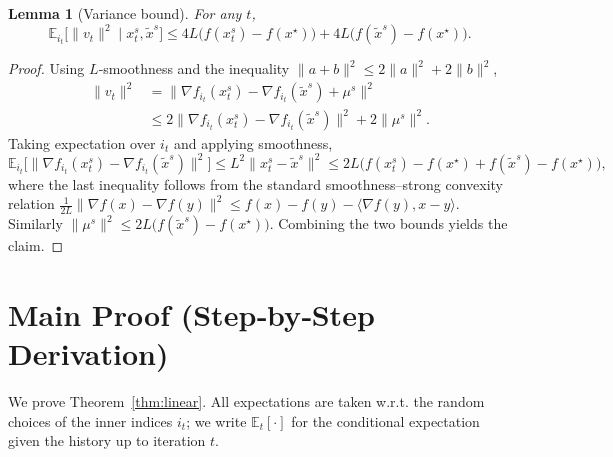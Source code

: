 \documentclass{article}
\newtheorem{lemma}{Lemma}
\begin{document}
\begin{lemma}[Variance bound]
\label{lem:variance}
For any $t$,
\[
\mathbb{E}_{i_t}\!\bigl[\|v_t\|^{2}\mid x^{s}_t,\tilde{x}^{s}\bigr]
\le 4L\bigl(f(x^{s}_t)-f(x^{\star})\bigr)
   +4L\bigl(f(\tilde{x}^{s})-f(x^{\star})\bigr).
\]
\end{lemma}
\begin{proof}
Using $L$‑smoothness and the inequality $\|a+b\|^{2}\le 2\|a\|^{2}+2\|b\|^{2}$,
\[
\begin{aligned}
\|v_t\|^{2}
&=\bigl\|\nabla f_{i_t}(x^{s}_t)-\nabla f_{i_t}(\tilde{x}^{s})
          +\mu^{s}\bigr\|^{2}\\
&\le 2\bigl\|\nabla f_{i_t}(x^{s}_t)-\nabla f_{i_t}(\tilde{x}^{s})\bigr\|^{2}
   +2\|\mu^{s}\|^{2}.
\end{aligned}
\]
Taking expectation over $i_t$ and applying smoothness,
\[
\mathbb{E}_{i_t}\!\bigl[\|\nabla f_{i_t}(x^{s}_t)-\nabla f_{i_t}(\tilde{x}^{s})\|^{2}\bigr]
\le L^{2}\|x^{s}_t-\tilde{x}^{s}\|^{2}
\le 2L\bigl(f(x^{s}_t)-f(x^{\star})+f(\tilde{x}^{s})-f(x^{\star})\bigr),
\]
where the last inequality follows from the standard smoothness–strong convexity relation
$\frac{1}{2L}\|\nabla f(x)-\nabla f(y)\|^{2}\le f(x)-f(y)-\langle\nabla f(y),x-y\rangle$.
Similarly $\|\mu^{s}\|^{2}\le 2L\bigl(f(\tilde{x}^{s})-f(x^{\star})\bigr)$. Combining the two bounds yields the claim.
\tag*{$\square$}
\end{proof}

\newpage
\section*{Main Proof (Step‑by‑Step Derivation)}
We prove Theorem~\ref{thm:linear}.  
All expectations are taken w.r.t. the random choices of the inner indices $i_t$; we write $\mathbb{E}_t[\cdot]$ for the conditional expectation given the history up to iteration $t$.
\end{document}
